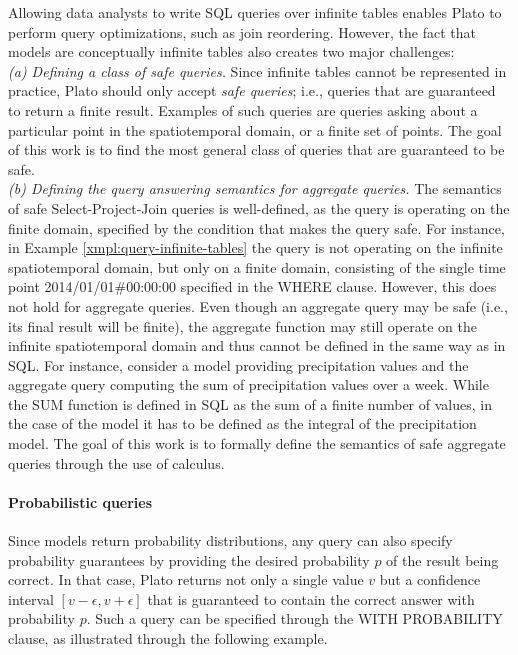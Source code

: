 Allowing data analysts to write SQL queries over infinite tables enables Plato to perform query optimizations, such as join reordering. However, the fact that models are conceptually infinite tables also creates two major challenges:\\

\emph{(a) Defining a class of safe queries.} Since infinite tables cannot be represented in practice, Plato should only accept {\em safe queries}; i.e., queries that are guaranteed to return a finite result. Examples of such queries are queries asking about a particular point in the spatiotemporal domain, or a finite set of points. The goal of this work is to find the most general class of queries that are guaranteed to be safe.\\

\emph{(b) Defining the query answering semantics for aggregate queries.} The semantics of safe Select-Project-Join queries is well-defined, as the query is operating on the finite domain, specified by the condition that makes the query safe. For instance, in Example \ref{xmpl:query-infinite-tables} the query is not operating on the infinite spatiotemporal domain, but only on a finite domain, consisting of the single time point 2014/01/01\#00:00:00 specified in the WHERE clause. However, this does not hold for aggregate queries. Even though an aggregate query may be safe (i.e., its final result will be finite), the aggregate function may still operate on the infinite spatiotemporal domain and thus cannot be defined in the same way as in SQL. For instance, consider a model providing precipitation values and the aggregate query computing the sum of precipitation values over a week. While the SUM function is defined in SQL as the sum of a finite number of values, in the case of the model it has to be defined as the integral of the precipitation model. The goal of this work is to formally define the semantics of safe aggregate queries through the use of calculus.\\

\paragraph{Probabilistic queries} Since models return probability distributions, any query can also specify probability guarantees by providing the desired probability $p$ of the result being correct. In that case, Plato returns not only a single value $v$ but a confidence interval $[v-\epsilon, v+\epsilon]$ that is guaranteed to contain the correct answer with probability $p$. Such a query can be specified through the WITH PROBABILITY clause, as illustrated through the following example.

